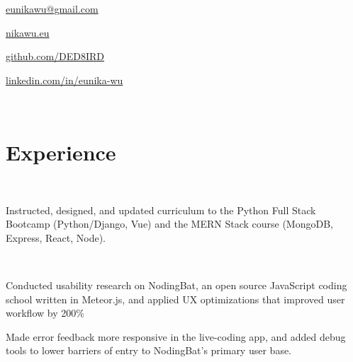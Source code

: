 \documentclass[]{hieudo-build}
\begin{document}
{
	\ci{\faAt} \href{mailto:eunikawu@gmail.com}{ eunikawu@gmail.com } 
	\par
    \ci{\faGlobe} \href{https://nikawu.eu}{ nikawu.eu } \par
	\ci{\faGithub} \href{https://github.com/DED8IRD}{ github.com/DED8IRD } 
	\par
	\ci{\faLinkedinSquare} \href{https://www.linkedin.com/in/eunika-wu/}{ linkedin.com/in/eunika-wu }
	\par
} \\
\sectionsep

%
%
\begin{minipage}[t]{0.62\textwidth} 

\section{Experience}

 \\
\vspace{\topsep}
\begin{tightemize}
\item Instructed, designed, and updated curriculum to the Python Full Stack Bootcamp (Python/Django, Vue) and the MERN Stack course (MongoDB, Express, React, Node). \\
\smallskip
\end{tightemize}
\sectionsep

 \\
\begin{tightemize}
\item Conducted usability research on NodingBat, an open source JavaScript coding school written in Meteor.js, and applied UX optimizations that improved user workflow by 200\% \\
\item Made error feedback more responsive in the live-coding app, and added debug tools to lower barriers of entry to NodingBat's primary user base.
\end{tightemize}
\sectionsep


\end{minipage}
\end{document}
